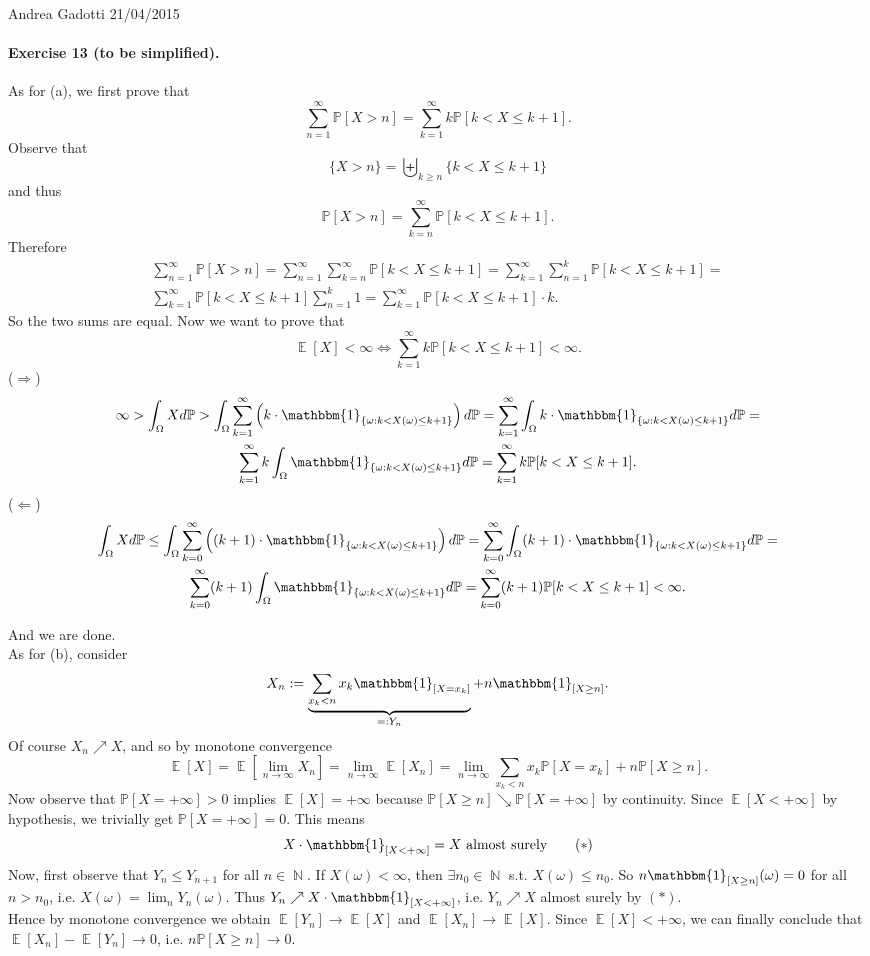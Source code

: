 \documentclass[12pt,a4paper]{report}
\theoremstyle{definition}
\theoremstyle{num.custom-title}
\DeclareMathOperator{\E}{\mathbb{E}}
\DeclareMathOperator{\N}{\mathbb{N}}
\renewcommand{\1}{\mathbbm{1}}
\renewcommand{\P}{\mathbb{P}}
\renewcommand{\iff}{\Leftrightarrow}
\begin{document}
\noindent Andrea Gadotti \hfill 21/04/2015

\paragraph{Exercise 13 (to be simplified).}
As for (a), we first prove that
\[
	\sum_{n=1}^\infty \P[X>n] = \sum_{k=1}^\infty k \P[k < X \leq k+1].
\]
Observe that 
\[
\{X>n\}= \biguplus_{k \geq n} \{k < X \leq k+1\}
\]
and thus 
\[
\P[X>n] = \sum_{k=n}^\infty \P[k < X \leq k+1].
\]
Therefore
\begin{multline*}
	\sum_{n=1}^\infty \P[X>n] = \sum_{n=1}^\infty \sum_{k=n}^\infty \P[k < X \leq k+1] = \sum_{k=1}^\infty \sum_{n=1}^k \P[k < X \leq k+1] =\\
	\sum_{k=1}^\infty \P[k < X \leq k+1] \sum_{n=1}^k 1 = \sum_{k=1}^\infty \P[k < X \leq k+1] \cdot k.
\end{multline*}
So the two sums are equal. Now we want to prove that 
\[
\E[X] < \infty \iff \sum_{k=1}^\infty k \P[k < X \leq k+1] < \infty.
\]
($\Longrightarrow$)
\begin{multline*}
	\infty > \int_\Omega X d\P > \int_\Omega \sum_{k=1}^\infty \left( k \cdot \1_{\{\omega : k<X(\omega) \leq k+1\}} \right) d\P= \sum_{k=1}^\infty \int_\Omega k \cdot \1_{\{\omega : k<X(\omega) \leq k+1\}} d\P=\\
	\sum_{k=1}^\infty k \int_\Omega \1_{\{\omega : k<X(\omega) \leq k+1\}} d\P = \sum_{k=1}^\infty k \P[k < X \leq k+1].
\end{multline*}
($\Longleftarrow$)
\begin{multline*}
	\int_\Omega X d\P \leq \int_\Omega \sum_{k=0}^\infty \left( (k+1) \cdot \1_{\{\omega : k<X(\omega) \leq k+1\}} \right) d\P = \sum_{k=0}^\infty \int_\Omega (k+1) \cdot \1_{\{\omega : k<X(\omega) \leq k+1\}} d\P=\\
	\sum_{k=0}^\infty (k+1) \int_\Omega \1_{\{\omega : k<X(\omega) \leq k+1\}} d\P = \sum_{k=0}^\infty (k+1) \P[k < X \leq k+1] < \infty.
\end{multline*}

And we are done.\\
As for (b), consider
\[
X_n := \underbrace{\sum_{x_k < n} x_k \1_{[X=x_k]}}_{=:Y_n} + n \1_{[X \geq n]}.
\]
Of course $X_n \nearrow X$, and so by monotone convergence
\[
\E[X] = \E[\lim_{n \to \infty} X_n] = \lim_{n \to \infty} \E[X_n] = \lim_{n \to \infty} \sum_{x_k < n} x_k \P[X=x_k] + n \P[X \geq n].
\]
Now observe that $\P[X=+\infty]>0$ implies $\E[X]=+\infty$ because $\P[X \geq n] \searrow \P[X=+\infty]$ by continuity. Since $\E[X<+\infty]$ by hypothesis, we trivially get $\P[X=+\infty]=0$. This means
\[
X \cdot \1_{[X<+\infty]} = X \text{ almost surely} \tag{$*$}
\]
Now, first observe that $Y_n \leq Y_{n+1}$ for all $n \in \N$. If $X(\omega) < \infty$, then $\exists n_0 \in \N$ s.t. $X(\omega) \leq n_0$. So $n \1_{[X \geq n]}(\omega)=0$ for all $n > n_0$, i.e. $X(\omega) = \lim_n Y_n(\omega)$. Thus $Y_n \nearrow X \cdot \1_{[X<+\infty]}$, i.e. $Y_n \nearrow X$ almost surely by $(*)$.\\
Hence by monotone convergence we obtain $\E[Y_n] \to \E[X]$ and $\E[X_n] \to \E[X]$. Since $\E[X]<+\infty$, we can finally conclude that $\E[X_n] - \E[Y_n] \to 0$, i.e. $n\P[X \geq n] \to 0$.
\end{document}
